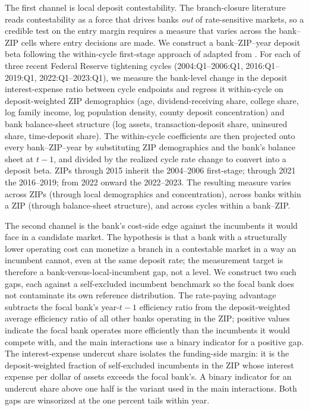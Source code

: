 The first channel is local deposit contestability. The branch-closure literature reads contestability as a force that drives banks \emph{out} of rate-sensitive markets, so a credible test on the entry margin requires a measure that varies across the bank--ZIP cells where entry decisions are made. We construct a bank--ZIP--year deposit beta following the within-cycle first-stage approach of \citet{narayanan2025decline} adapted from \citet{DSS2017}. For each of three recent Federal Reserve tightening cycles (2004:Q1--2006:Q1, 2016:Q1--2019:Q1, 2022:Q1--2023:Q1), we measure the bank-level change in the deposit interest-expense ratio between cycle endpoints and regress it within-cycle on deposit-weighted ZIP demographics (age, dividend-receiving share, college share, log family income, log population density, county deposit concentration) and bank balance-sheet structure (log assets, transaction-deposit share, uninsured share, time-deposit share). The within-cycle coefficients are then projected onto every bank--ZIP--year by substituting ZIP demographics and the bank's balance sheet at $t-1$, and divided by the realized cycle rate change to convert into a deposit beta. ZIPs through 2015 inherit the 2004--2006 first-stage; through 2021 the 2016--2019; from 2022 onward the 2022--2023. The resulting measure varies across ZIPs (through local demographics and concentration), across banks within a ZIP (through balance-sheet structure), and across cycles within a bank--ZIP.

The second channel is the bank's cost-side edge against the incumbents it would face in a candidate market. The hypothesis is that a bank with a structurally lower operating cost can monetize a branch in a contestable market in a way an incumbent cannot, even at the same deposit rate; the measurement target is therefore a bank-versus-local-incumbent gap, not a level. We construct two such gaps, each against a self-excluded incumbent benchmark so the focal bank does not contaminate its own reference distribution. The rate-paying advantage subtracts the focal bank's year-$t-1$ efficiency ratio from the deposit-weighted average efficiency ratio of all other banks operating in the ZIP; positive values indicate the focal bank operates more efficiently than the incumbents it would compete with, and the main interactions use a binary indicator for a positive gap. The interest-expense undercut share isolates the funding-side margin: it is the deposit-weighted fraction of self-excluded incumbents in the ZIP whose interest expense per dollar of assets exceeds the focal bank's. A binary indicator for an undercut share above one half is the variant used in the main interactions. Both gaps are winsorized at the one percent tails within year.

